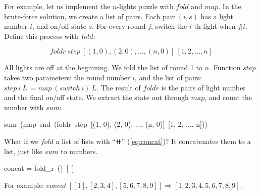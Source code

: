\documentclass[b5paper]{article}
\begin{document}
For example, let us implement the $n$-lights puzzle with $fold$ and $map$. In the brute-force solution, we create a list of pairs. Each pair $(i, s)$ has a light number $i$, and on/off state $s$. For every round $j$, switch the $i$-th light when $j | i$. Define this process with $fold$:

\[
foldr\ step\ [(1, 0), (2, 0), ..., (n, 0)]\ [1, 2, ..., n]
\]

All lights are off at the beginning. We fold the list of round 1 to $n$. Function $step$ takes two parameters: the round number $i$, and the list of pairs: $step\ i\ L\ = map\ (switch\ i)\ L$. The result of $foldr$ is the pairs of light number and the final on/off state. We extract the state out through $map$, and count the number with $sum$:

\be
sum\ (map\ snd\ (foldr\ step\ [(1, 0), (2, 0), ..., (n, 0)]\ [1, 2, ..., n]))
\ee

What if we $fold$ a list of lists with ``$\doubleplus$'' (\cref{eq:concat})? It concatenates them to a list, just like $sum$ to numbers.

\be
concat = fold_r\ (\doubleplus)\ [\ ]
\ee

For example: $concat\ [[1], [2, 3, 4], [5, 6, 7, 8, 9]] \Rightarrow [1, 2, 3, 4, 5, 6, 7, 8, 9]$.

\begin{Exercise}\label{ex:list-fold}
\end{Exercise}
\end{document}
